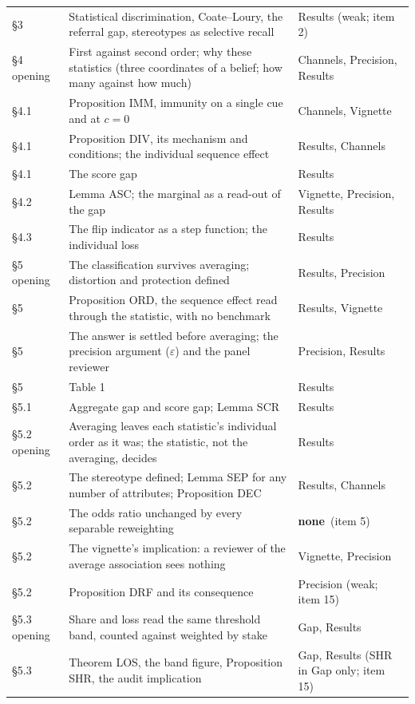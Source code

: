 \documentclass[11pt,a4paper]{article}
\newcommand{\none}{\textbf{none}}
\begin{document}
\begin{longtable}{@{}p{1.7cm}p{9.6cm}p{4.0cm}@{}}
\S3 & Statistical discrimination, Coate--Loury, the referral gap, stereotypes as selective recall & Results (weak; item 2)\\
\addlinespace
\S4 opening & First against second order; why these statistics (three coordinates of a belief; how many against how much) & Channels, Precision, Results\\
\S4.1 & Proposition IMM, immunity on a single cue and at $c=0$ & Channels, Vignette\\
\S4.1 & Proposition DIV, its mechanism and conditions; the individual sequence effect & Results, Channels\\
\S4.1 & The score gap & Results\\
\S4.2 & Lemma ASC; the marginal as a read-out of the gap & Vignette, Precision, Results\\
\S4.3 & The flip indicator as a step function; the individual loss & Results\\
\addlinespace
\S5 opening & The classification survives averaging; distortion and protection defined & Results, Precision\\
\S5 & Proposition ORD, the sequence effect read through the statistic, with no benchmark & Results, Vignette\\
\S5 & The answer is settled before averaging; the precision argument ($\varepsilon$) and the panel reviewer & Precision, Results\\
\S5 & Table 1 & Results\\
\S5.1 & Aggregate gap and score gap; Lemma SCR & Results\\
\S5.2 opening & Averaging leaves each statistic's individual order as it was; the statistic, not the averaging, decides & Results\\
\S5.2 & The stereotype defined; Lemma SEP for any number of attributes; Proposition DEC & Results, Channels\\
\S5.2 & The odds ratio unchanged by every separable reweighting & \none\ (item 5)\\
\S5.2 & The vignette's implication: a reviewer of the average association sees nothing & Vignette, Precision\\
\S5.2 & Proposition DRF and its consequence & Precision (weak; item 15)\\
\S5.3 opening & Share and loss read the same threshold band, counted against weighted by stake & Gap, Results\\
\S5.3 & Theorem LOS, the band figure, Proposition SHR, the audit implication & Gap, Results (SHR in Gap only; item 15)\\

\end{longtable}
\end{document}
